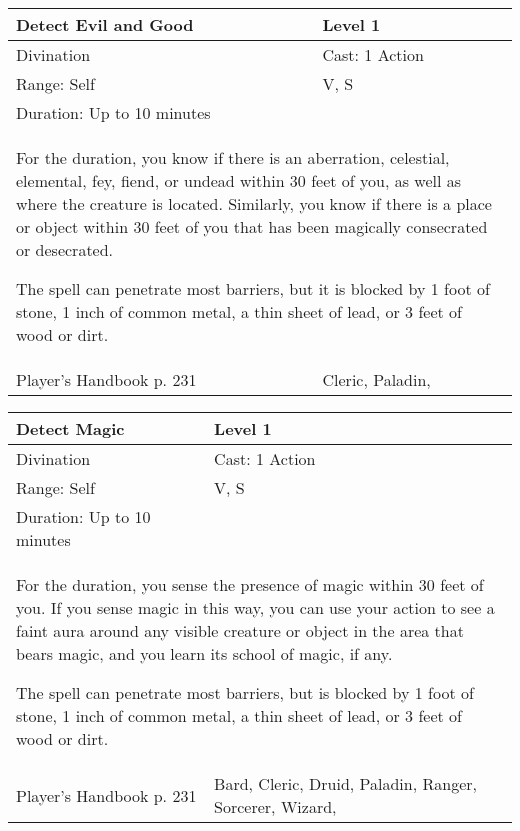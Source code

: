 \documentclass[11pt]{report}
\begin{document}
\begin{table}[H]
	\begin{tabular}{||p{6cm}|p{6cm}||}
		\hline\hline
		\bf{Detect Evil and Good} & Level 1\\ \hline
		Divination & Cast: 1 Action\\ \hline
		Range: Self & V, S\\ \hline
		Duration: Up to 10 minutes & \\ \hline
		\multicolumn{2}{||p{12cm}||}{For the duration, you know if there is an aberration, celestial, elemental, fey, fiend, or undead within 30 feet of you, as well as where the creature is located. Similarly, you know if there is a place or object within 30 feet of you that has been magically consecrated or desecrated. 

The spell can penetrate most barriers, but it is blocked by 1 foot of stone, 1 inch of common metal, a thin sheet of lead, or 3 feet of wood or dirt.}\\ \hline
Player's Handbook p. 231 & Cleric, Paladin, \\ \hline\hline
	\end{tabular}
\end{table}

\begin{table}[H]
	\begin{tabular}{||p{6cm}|p{6cm}||}
		\hline\hline
		\bf{Detect Magic} & Level 1\\ \hline
		Divination & Cast: 1 Action\\ \hline
		Range: Self & V, S\\ \hline
		Duration: Up to 10 minutes & \\ \hline
		\multicolumn{2}{||p{12cm}||}{For the duration, you sense the presence of magic within 30 feet of you. If you sense magic in this way, you can use your action to see a faint aura around any visible creature or object in the area that bears magic, and you learn its school of magic, if any. 

The spell can penetrate most barriers, but is blocked by 1 foot of stone, 1 inch of common metal, a thin sheet of lead, or 3 feet of wood or dirt.}\\ \hline
Player's Handbook p. 231 & Bard, Cleric, Druid, Paladin, Ranger, Sorcerer, Wizard, \\ \hline\hline
	\end{tabular}
\end{table}
\end{document}

